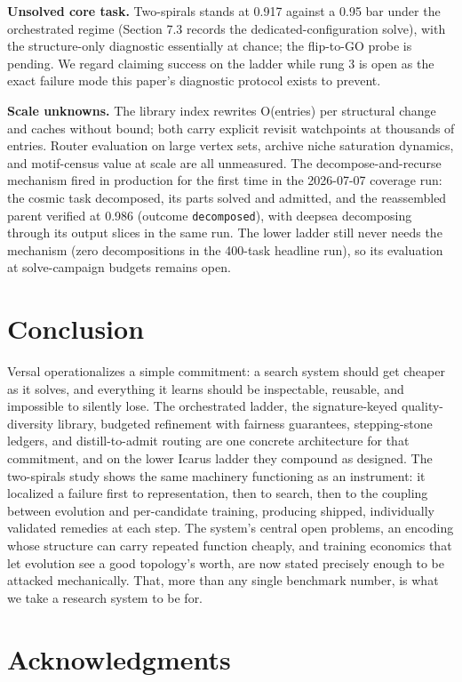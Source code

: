 \documentclass[11pt]{article}
\begin{document}
\textbf{Unsolved core task.} Two-spirals stands at 0.917 against a 0.95 bar under the orchestrated regime (Section 7.3 records the dedicated-configuration solve), with the structure-only diagnostic essentially at chance; the flip-to-GO probe is pending. We regard claiming success on the ladder while rung 3 is open as the exact failure mode this paper's diagnostic protocol exists to prevent.

\textbf{Scale unknowns.} The library index rewrites O(entries) per structural change and caches without bound; both carry explicit revisit watchpoints at thousands of entries. Router evaluation on large vertex sets, archive niche saturation dynamics, and motif-census value at scale are all unmeasured. The decompose-and-recurse mechanism fired in production for the first time in the 2026-07-07 coverage run: the cosmic task decomposed, its parts solved and admitted, and the reassembled parent verified at 0.986 (outcome \texttt{decomposed}), with deepsea decomposing through its output slices in the same run. The lower ladder still never needs the mechanism (zero decompositions in the 400-task headline run), so its evaluation at solve-campaign budgets remains open.

\section{Conclusion}

Versal operationalizes a simple commitment: a search system should get cheaper as it solves, and everything it learns should be inspectable, reusable, and impossible to silently lose. The orchestrated ladder, the signature-keyed quality-diversity library, budgeted refinement with fairness guarantees, stepping-stone ledgers, and distill-to-admit routing are one concrete architecture for that commitment, and on the lower Icarus ladder they compound as designed. The two-spirals study shows the same machinery functioning as an instrument: it localized a failure first to representation, then to search, then to the coupling between evolution and per-candidate training, producing shipped, individually validated remedies at each step. The system's central open problems, an encoding whose structure can carry repeated function cheaply, and training economics that let evolution see a good topology's worth, are now stated precisely enough to be attacked mechanically. That, more than any single benchmark number, is what we take a research system to be for.

\section*{Acknowledgments}
\end{document}
